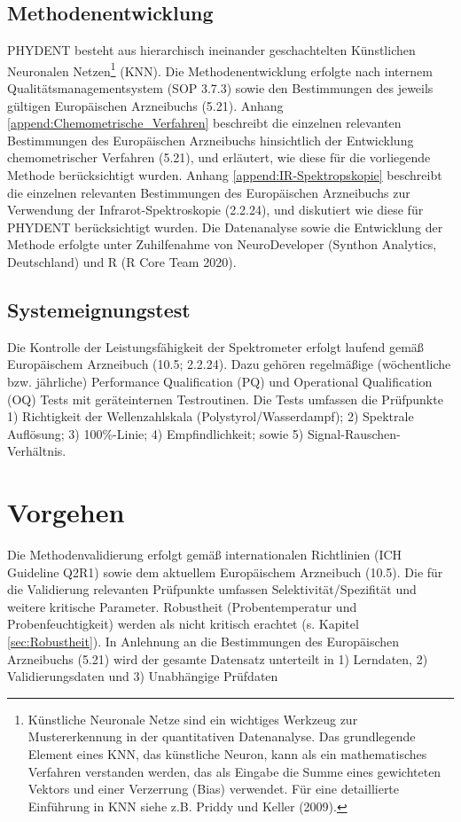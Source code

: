 \documentclass[11pt, a4paper]{article}
\newcommand\VersionPhEur{10.5}
\begin{document}
\subsection{Methodenentwicklung}
PHYDENT besteht aus hierarchisch ineinander geschachtelten Künstlichen Neuronalen Netzen\footnote{Künstliche Neuronale Netze sind ein wichtiges Werkzeug zur Mustererkennung in der quantitativen Datenanalyse. Das grundlegende Element eines KNN, das künstliche Neuron, kann als ein mathematisches Verfahren verstanden werden, das als Eingabe die Summe eines gewichteten Vektors und einer Verzerrung (Bias) verwendet. Für eine detaillierte Einführung in KNN siehe z.B. Priddy und Keller (2009).} (KNN). Die Methodenentwicklung erfolgte nach internem Qualitätsmanagementsystem (SOP 3.7.3) sowie den Bestimmungen des jeweils gültigen Europäischen Arzneibuchs (5.21). Anhang \ref{append:Chemometrische_Verfahren} beschreibt die einzelnen relevanten Bestimmungen des Europäischen Arzneibuchs hinsichtlich der Entwicklung chemometrischer Verfahren (5.21), und erläutert, wie diese für die vorliegende Methode berücksichtigt wurden. Anhang \ref{append:IR-Spektropskopie} beschreibt die einzelnen relevanten Bestimmungen des Europäischen Arzneibuchs zur Verwendung der Infrarot-Spektroskopie (2.2.24), und diskutiert wie diese für PHYDENT berücksichtigt wurden. Die Datenanalyse sowie die Entwicklung der Methode erfolgte unter Zuhilfenahme von NeuroDeveloper (Synthon Analytics, Deutschland) und R (R Core Team 2020).

\subsection{Systemeignungstest}
Die Kontrolle der Leistungsfähigkeit der Spektrometer erfolgt laufend gemäß Europäischem Arzneibuch (\VersionPhEur; 2.2.24). Dazu gehören regelmäßige (wöchentliche bzw. jährliche) Performance Qualification (PQ) und Operational Qualification (OQ) Tests mit geräteinternen Testroutinen. Die Tests umfassen die Prüfpunkte 1) Richtigkeit der Wellenzahlskala (Polystyrol/Wasserdampf); 2) Spektrale Auflösung; 3) 100\%-Linie; 4) Empfindlichkeit; sowie 5) Signal-Rauschen-Verhältnis.


\section{Vorgehen}
\label{sec:Vorgehen}
Die Methodenvalidierung erfolgt gemäß internationalen Richtlinien (ICH Guideline Q2R1) sowie dem aktuellem Europäischem Arzneibuch (\VersionPhEur). Die für die Validierung relevanten Prüfpunkte umfassen Selektivität/Spezifität und weitere kritische Parameter. Robustheit (Probentemperatur und Probenfeuchtigkeit) werden als nicht kritisch erachtet (s. Kapitel \ref{sec:Robustheit}). In Anlehnung an die Bestimmungen des Europäischen Arzneibuchs (5.21) wird der gesamte Datensatz unterteilt in 1) Lerndaten, 2) Validierungsdaten und 3) Unabhängige Prüfdaten
\end{document}
